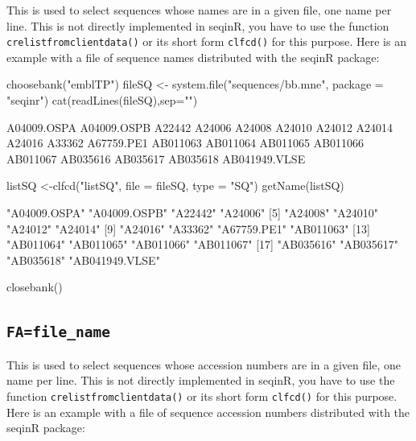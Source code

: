 \documentclass{article}
\begin{document}
This is used to select sequences whose names are in a given file, one name per line.
This is not directly implemented in seqinR, you have to use the function
\texttt{crelistfromclientdata()} or its short form \texttt{clfcd()} for this purpose. Here is an example with
a file of sequence names distributed with the seqinR package:

\begin{Schunk}
\begin{Sinput}
 choosebank("emblTP")
 fileSQ <- system.file("sequences/bb.mne", package = "seqinr")
 cat(readLines(fileSQ),sep="\n")
\end{Sinput}
\begin{Soutput}
A04009.OSPA
A04009.OSPB
A22442
A24006
A24008
A24010
A24012
A24014
A24016
A33362
A67759.PE1
AB011063
AB011064
AB011065
AB011066
AB011067
AB035616
AB035617
AB035618
AB041949.VLSE
\end{Soutput}
\begin{Sinput}
 listSQ <-clfcd("listSQ", file = fileSQ, type = "SQ")
 getName(listSQ)
\end{Sinput}
\begin{Soutput}
 [1] "A04009.OSPA"   "A04009.OSPB"   "A22442"        "A24006"       
 [5] "A24008"        "A24010"        "A24012"        "A24014"       
 [9] "A24016"        "A33362"        "A67759.PE1"    "AB011063"     
[13] "AB011064"      "AB011065"      "AB011066"      "AB011067"     
[17] "AB035616"      "AB035617"      "AB035618"      "AB041949.VLSE"
\end{Soutput}
\begin{Sinput}
 closebank()
\end{Sinput}
\end{Schunk}


\subsection{\texttt{FA=file\_name}}

This is used to select sequences whose accession numbers are in a given file, one name per line.
This is not directly implemented in seqinR, you have to use the function
\texttt{crelistfromclientdata()} or its short form \texttt{clfcd()} for this purpose. Here is an example with
a file of sequence accession numbers distributed with the seqinR package:
\end{document}
